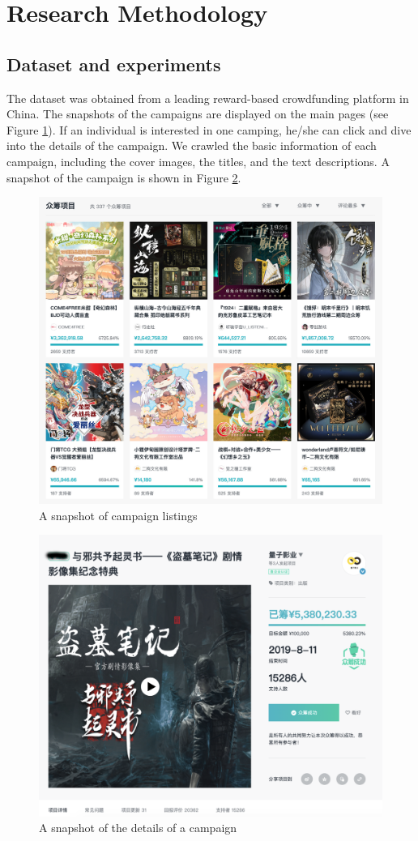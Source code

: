 \documentclass[a4paper]{article}
\begin{document}
\section{Research Methodology}
\subsection{Dataset and experiments}
The dataset was obtained from a leading reward-based crowdfunding platform in China. The snapshots of the campaigns are displayed on the main pages (see Figure \ref{fig:Snapshot_listings}). If an individual is interested in one camping, he/she can click and dive into the details of the campaign. We crawled the basic information of each campaign, including the cover images, the titles, and the text descriptions. A snapshot of the campaign is shown in Figure \ref{fig:Snapshot}. 

\begin{figure}[ht!]
    \centering
    \includegraphics[width=0.75\linewidth]{modian_snapshots.jpg}
    \caption{A snapshot of campaign listings}
    \label{fig:Snapshot_listings}
\end{figure}

\begin{figure}[ht!]
    \centering
    \includegraphics[width=0.75\linewidth]{modian_sample.png}
    \caption{A snapshot of the details of a campaign}
    \label{fig:Snapshot}
\end{figure}
\end{document}
